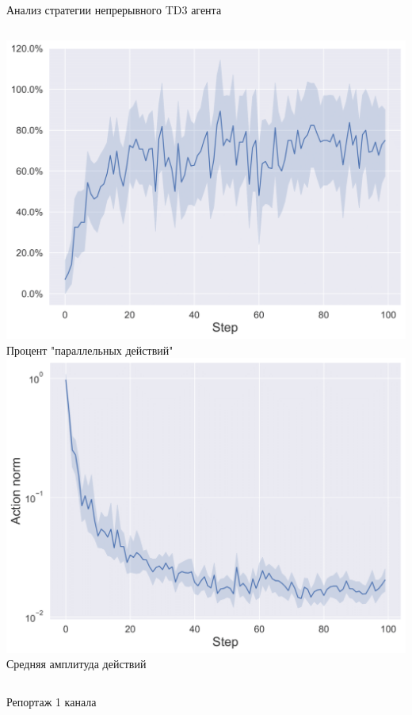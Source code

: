 \begin{frame}{Анализ стратегии непрерывного TD3 агента}
\begin{columns}
\centering
\includegraphics[width=1\linewidth]{Presentation/images/parallel_actions.png}
Процент "параллельных действий"
\centering
\includegraphics[width=1\linewidth]{Presentation/images/action_norm_decrease.png}
Средняя амплитуда действий
\end{columns}
\end{frame}

\begin{frame}{Репортаж 1 канала}
    
\end{frame}

